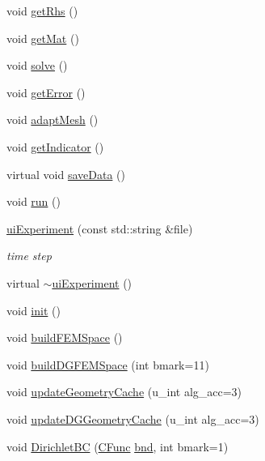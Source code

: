 \begin{DoxyCompactItemize}
\item 
void \mbox{\hyperlink{classui_experiment_a1c015a570ae4f2a1c8db01275497753f}{get\+Rhs}} ()
\item 
void \mbox{\hyperlink{classui_experiment_ad09537c271da486d93b126d06e31dd2f}{get\+Mat}} ()
\item 
void \mbox{\hyperlink{classui_experiment_a542aa9e02b2ff7f40975ecce7b00a304}{solve}} ()
\item 
void \mbox{\hyperlink{classui_experiment_a4a8beb61cd0e3061d9be1273c371cadf}{get\+Error}} ()
\item 
void \mbox{\hyperlink{classui_experiment_ab560aa75b58cc9bba585adf8f6ce7d76}{adapt\+Mesh}} ()
\item 
void \mbox{\hyperlink{classui_experiment_aa01307f80d55f23738cd9ae0876280b3}{get\+Indicator}} ()
\item 
virtual void \mbox{\hyperlink{classui_experiment_a62f19f7927000e2b2b6946513917aef4}{save\+Data}} ()
\item 
void \mbox{\hyperlink{classui_experiment_aab82b5571ffb6a05e3104b7fc50ca34a}{run}} ()
\item 
\mbox{\hyperlink{classui_experiment_aaebdbaabc4e6ab6d83015dff92519d2c}{ui\+Experiment}} (const std\+::string \&file)
\begin{DoxyCompactList}\small\item\em time step \end{DoxyCompactList}\item 
virtual \mbox{\hyperlink{classui_experiment_a068797017d5804783e97385921c13253}{$\sim$ui\+Experiment}} ()
\item 
void \mbox{\hyperlink{classui_experiment_af19926858d11ccf9cb6a732112e381ed}{init}} ()
\item 
void \mbox{\hyperlink{classui_experiment_a82e71dbd631d00315763e0514608f0fb}{build\+F\+E\+M\+Space}} ()
\item 
void \mbox{\hyperlink{classui_experiment_af36eded6a690c993106e851452b52c74}{build\+D\+G\+F\+E\+M\+Space}} (int bmark=11)
\item 
void \mbox{\hyperlink{classui_experiment_a406d18d100eaa0c03139590bfa6092af}{update\+Geometry\+Cache}} (u\+\_\+int alg\+\_\+acc=3)
\item 
void \mbox{\hyperlink{classui_experiment_a0c145963361c8f511360e994833a48ef}{update\+D\+G\+Geometry\+Cache}} (u\+\_\+int alg\+\_\+acc=3)
\item 
void \mbox{\hyperlink{classui_experiment_a03675f636c0949ae93bed21719f9a820}{Dirichlet\+BC}} (\mbox{\hyperlink{complex__node___t_h_f_e_m_2emdefs_8h_af8816f473dfdd972d676674921eb65f3}{C\+Func}} \mbox{\hyperlink{complex__node___t_h_f_e_m_2parameter_8h_a0150c722a481cbca4663d2d8b9a9f903}{bnd}}, int bmark=1)

\end{DoxyCompactItemize}

